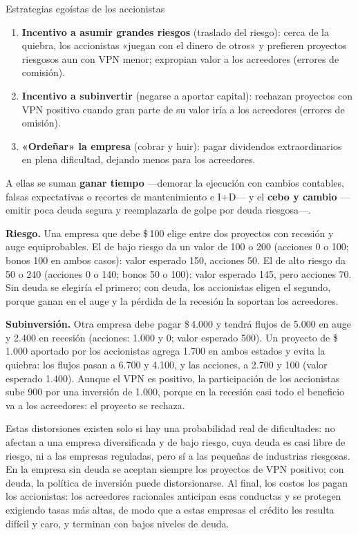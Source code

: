 \begin{definicion}{Estrategias egoístas de los accionistas}
\begin{enumerate}
\item \textbf{Incentivo a asumir grandes riesgos} (traslado del riesgo): cerca de la quiebra, los accionistas «juegan con el dinero de otros» y prefieren proyectos riesgosos aun con VPN menor; expropian valor a los acreedores (errores de comisión).
\item \textbf{Incentivo a subinvertir} (negarse a aportar capital): rechazan proyectos con VPN positivo cuando gran parte de su valor iría a los acreedores (errores de omisión).
\item \textbf{«Ordeñar» la empresa} (cobrar y huir): pagar dividendos extraordinarios en plena dificultad, dejando menos para los acreedores.
\end{enumerate}
A ellas se suman \textbf{ganar tiempo} —demorar la ejecución con cambios contables, falsas expectativas o recortes de mantenimiento e I+D— y el \textbf{cebo y cambio} —emitir poca deuda segura y reemplazarla de golpe por deuda riesgosa—.
\end{definicion}

\begin{ejemplo}
\textbf{Riesgo.} Una empresa que debe \$\,100 elige entre dos proyectos con recesión y auge equiprobables. El de bajo riesgo da un valor de 100 o 200 (acciones 0 o 100; bonos 100 en ambos casos): valor esperado 150, acciones 50. El de alto riesgo da 50 o 240 (acciones 0 o 140; bonos 50 o 100): valor esperado 145, pero acciones 70. Sin deuda se elegiría el primero; con deuda, los accionistas eligen el segundo, porque ganan en el auge y la pérdida de la recesión la soportan los acreedores.

\textbf{Subinversión.} Otra empresa debe pagar \$\,4.000 y tendrá flujos de 5.000 en auge y 2.400 en recesión (acciones: 1.000 y 0; valor esperado 500). Un proyecto de \$\,1.000 aportado por los accionistas agrega 1.700 en ambos estados y evita la quiebra: los flujos pasan a 6.700 y 4.100, y las acciones, a 2.700 y 100 (valor esperado 1.400). Aunque el VPN es positivo, la participación de los accionistas sube 900 por una inversión de 1.000, porque en la recesión casi todo el beneficio va a los acreedores: el proyecto se rechaza.
\end{ejemplo}

Estas distorsiones existen solo si hay una probabilidad real de dificultades: no afectan a una empresa diversificada y de bajo riesgo, cuya deuda es casi libre de riesgo, ni a las empresas reguladas, pero sí a las pequeñas de industrias riesgosas. En la empresa sin deuda se aceptan siempre los proyectos de VPN positivo; con deuda, la política de inversión puede distorsionarse. Al final, los costos los pagan los accionistas: los acreedores racionales anticipan esas conductas y se protegen exigiendo tasas más altas, de modo que a estas empresas el crédito les resulta difícil y caro, y terminan con bajos niveles de deuda.

